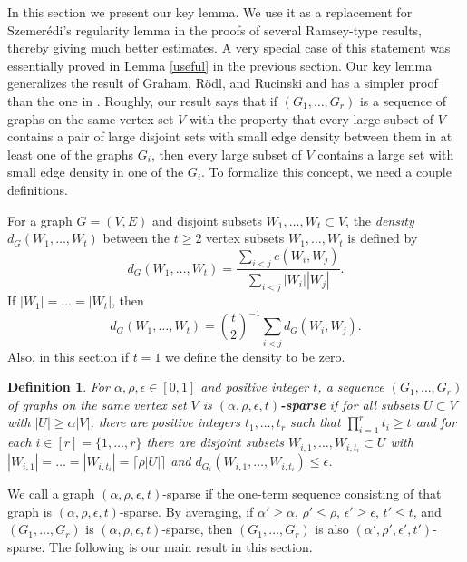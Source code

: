 \documentclass[11pt]{article}
\newtheorem{definition}[theorem]{Definition}
\begin{document}
In this section we present our key lemma. We use it as a
replacement for Szemer\'edi's regularity lemma in the proofs of several Ramsey-type results,
thereby giving much better estimates.  A very special case of this statement was
essentially proved in Lemma \ref{useful} in the previous section.
Our key lemma generalizes the result of Graham, R\"odl, and
Rucinski \cite{GrRoRu} and has a simpler proof
than the one in  \cite{GrRoRu}.
Roughly, our result says that if $(G_1,\ldots,G_r)$ is a
sequence of graphs on the same vertex set $V$ with the property that
every large subset of $V$ contains a pair of large disjoint sets
with small edge density between them in at least one of the graphs $G_i$,
then every large subset of $V$ contains a large set with
small edge density in one of the $G_i$. To formalize this concept,
we need a couple definitions.

For a graph $G=(V,E)$ and disjoint subsets $W_1,\ldots,W_t \subset V$, the {\it density} $d_{G}(W_1,\ldots,W_t)$
between the $t \geq 2$ vertex subsets $W_1,\ldots,W_t$ is defined by
$$d_G(W_1,\ldots,W_t)=\frac{\sum_{ i < j}
e(W_i,W_j)}{\sum_{i < j } |W_i||W_j|}.$$ If
$|W_1|=\ldots=|W_t|$, then
$$d_G(W_1,\ldots,W_t)={t \choose 2}^{-1}\sum_{ i < j }
d_G(W_i,W_j).$$
Also, in this section if $t=1$ we define the density to be zero.

\begin{definition} \label{d31}
For $\alpha,\rho,\epsilon \in [0,1]$ and positive integer $t$, a
sequence $(G_1,\ldots,G_r)$ of graphs on the same vertex set $V$ is
{\bf $(\alpha,\rho,\epsilon,t)$-sparse} if for all subsets $U
\subset V$ with $|U| \geq \alpha |V|$, there are positive integers
$t_1,\ldots,t_r$ such that $\prod_{i=1}^r t_i \geq t$ and for each
$i \in [r]=\{1, \ldots, r\}$ there are disjoint subsets
$W_{i,1},\ldots,W_{i,t_i} \subset U$ with $|W_{i,1}|=\ldots
=|W_{i,t_i}|=\lceil \rho |U|\rceil$ and
$d_{G_i}(W_{i,1},\ldots,W_{i,t_i})\leq \epsilon$.
\end{definition}

We call a graph $(\alpha,\rho,\epsilon,t)$-sparse if the one-term
sequence consisting of that graph is
$(\alpha,\rho,\epsilon,t)$-sparse. By averaging, if $\alpha'\geq
\alpha$, $\rho' \leq \rho$, $\epsilon'\geq \epsilon$, $t' \leq t$,
and $(G_1,\ldots,G_r)$ is $(\alpha,\rho,\epsilon,t)$-sparse, then
$(G_1,\ldots,G_r)$ is also $(\alpha',\rho',\epsilon',t')$-sparse.
The following is our main result in this section.
\end{document}
